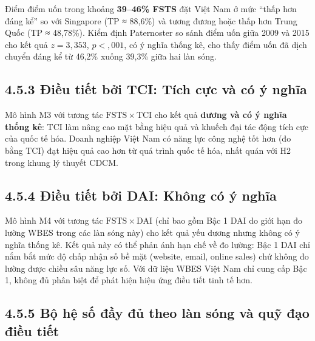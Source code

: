 \documentclass[
  a4paper,
  13pt]{extreport}
\begin{document}
Điểm điểm uốn trong khoảng \textbf{39--46\% FSTS} đặt Việt Nam ở mức
``thấp hơn đáng kể'' so với Singapore (TP ≈ 88,6\%) và tương đương hoặc
thấp hơn Trung Quốc (TP ≈ 48,78\%). Kiểm định Paternoster so sánh điểm
uốn giữa 2009 và 2015 cho kết quả \(z = 3{,}353\), \(p < {,}001\), có ý
nghĩa thống kê, cho thấy điểm uốn đã dịch chuyển đáng kể từ 46,2\% xuống
39,3\% giữa hai làn sóng.

\hypertarget{ux111iux1ec1u-tiux1ebft-bux1edfi-tci-tuxedch-cux1ef1c-vuxe0-cuxf3-uxfd-nghux129a}{%
\subsection{4.5.3 Điều tiết bởi TCI: Tích cực và có ý
nghĩa}\label{ux111iux1ec1u-tiux1ebft-bux1edfi-tci-tuxedch-cux1ef1c-vuxe0-cuxf3-uxfd-nghux129a}}

Mô hình M3 với tương tác \(\mathrm{FSTS} \times \mathrm{TCI}\) cho kết
quả \textbf{dương và có ý nghĩa thống kê}: TCI làm nâng cao mặt bằng
hiệu quả và khuếch đại tác động tích cực của quốc tế hóa. Doanh nghiệp
Việt Nam có năng lực công nghệ tốt hơn (đo bằng TCI) đạt hiệu quả cao
hơn từ quá trình quốc tế hóa, nhất quán với H2 trong khung lý thuyết
CDCM.

\hypertarget{ux111iux1ec1u-tiux1ebft-bux1edfi-dai-khuxf4ng-cuxf3-uxfd-nghux129a}{%
\subsection{4.5.4 Điều tiết bởi DAI: Không có ý
nghĩa}\label{ux111iux1ec1u-tiux1ebft-bux1edfi-dai-khuxf4ng-cuxf3-uxfd-nghux129a}}

Mô hình M4 với tương tác \(\mathrm{FSTS} \times \mathrm{DAI}\) (chỉ bao
gồm Bậc 1 DAI do giới hạn đo lường WBES trong các làn sóng này) cho kết
quả yếu dương nhưng không có ý nghĩa thống kê. Kết quả này có thể phản
ánh hạn chế về đo lường: Bậc 1 DAI chỉ nắm bắt mức độ chấp nhận số bề
mặt (website, email, online sales) chứ không đo lường được chiều sâu
năng lực số. Với dữ liệu WBES Việt Nam chỉ cung cấp Bậc 1, không đủ phân
biệt để phát hiện hiệu ứng điều tiết tinh tế hơn.

\hypertarget{bux1ed9-hux1ec7-sux1ed1-ux111ux1ea7y-ux111ux1ee7-theo-luxe0n-suxf3ng-vuxe0-quux1ef9-ux111ux1ea1o-ux111iux1ec1u-tiux1ebft}{%
\subsection{4.5.5 Bộ hệ số đầy đủ theo làn sóng và quỹ đạo điều
tiết}\label{bux1ed9-hux1ec7-sux1ed1-ux111ux1ea7y-ux111ux1ee7-theo-luxe0n-suxf3ng-vuxe0-quux1ef9-ux111ux1ea1o-ux111iux1ec1u-tiux1ebft}}
\end{document}
